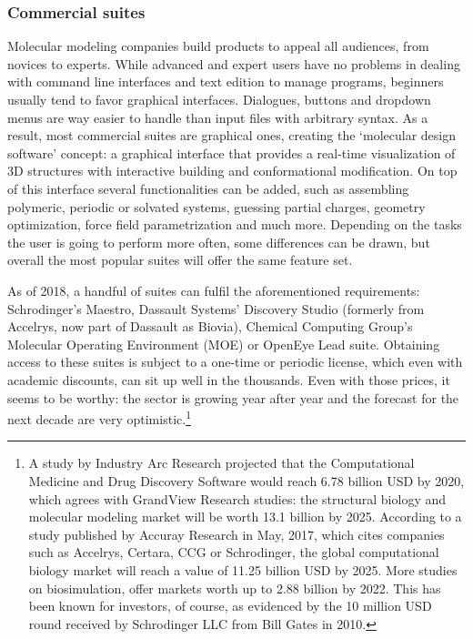 \subsubsection{Commercial suites}
Molecular modeling companies build products to appeal all audiences, from novices to experts. While advanced and expert users have no problems in dealing with command line interfaces and text edition to manage programs, beginners usually tend to favor graphical interfaces. Dialogues, buttons and dropdown menus are way easier to handle than input files with arbitrary syntax. As a result, most commercial suites are graphical ones, creating the ‘molecular design software’ concept: a graphical interface that provides a real-time visualization of 3D structures with interactive building and conformational modification. On top of this interface several functionalities can be added, such as assembling polymeric, periodic or solvated systems, guessing partial charges, geometry optimization, force field parametrization and much more. Depending on the tasks the user is going to perform more often, some differences can be drawn, but overall the most popular suites will offer the same feature set.

As of 2018, a handful of suites can fulfil the aforementioned requirements: Schrodinger’s Maestro,\cite{XXX} Dassault Systems’ Discovery Studio (formerly from Accelrys, now part of Dassault as Biovia),\cite{XXX} Chemical Computing Group’s Molecular Operating Environment (MOE)\cite{XXX} or OpenEye Lead suite.\cite{XXX} Obtaining access to these suites is subject to a one-time or periodic license, which even with academic discounts, can sit up well in the thousands. Even with those prices, it seems to be worthy: the sector is growing year after year and the forecast for the next decade are very optimistic.\footnote{A study by Industry Arc Research projected that the Computational Medicine and Drug Discovery Software would reach 6.78 billion USD by 2020,\cite{industryarc} which agrees with GrandView Research studies: the structural biology and molecular modeling market will be worth 13.1 billion by 2025.\cite{grandviewresearch} According to a study published by Accuray Research in May, 2017,\cite{Accuray} which cites companies such as Accelrys, Certara, CCG or Schrodinger, the global computational biology market will reach a value of 11.25 billion USD by 2025. More studies on biosimulation, offer markets worth up to 2.88 billion by 2022.\cite{marketsandmarkets} This has been known for investors, of course, as evidenced by the 10 million USD round received by Schrodinger LLC from Bill Gates in 2010.}

